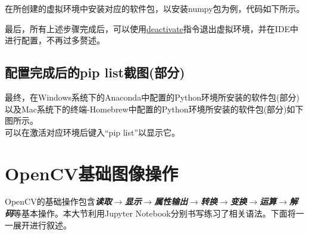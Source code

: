 \documentclass[11pt]{article}
\begin{document}
\begin{enumerate}
    	在所创建的虚拟环境中安装对应的软件包，以安装numpy包为例，代码如下所示。
    	\begin{center}
    	\end{center}
    	
    	最后，所有上述步骤完成后，可以使用\underline{deactivate}指令退出虚拟环境，并在IDE中进行配置，不再过多赘述。
    	\subsection{配置完成后的pip list截图(部分)}
    	最终，在Windows系统下的Anaconda中配置的Python环境所安装的软件包(部分)以及Mac系统下的终端-Homebrew中配置的Python环境所安装的软件包(部分)如下图所示。\\
    	可以在激活对应环境后键入“pip list”以显示它。
    \begin{center}
	\end{center}
	
    \end{enumerate}
    
    
    \section{OpenCV基础图像操作}
    OpenCV的基础操作包含\textbf{\textit{读取$\to$显示$\to$属性输出$\to$转换$\to$变换$\to$运算$\to$解码}}等基本操作。本大节利用Jupyter Notebook分别书写练习了相关语法。下面将一一展开进行叙述。
    
\end{document}
